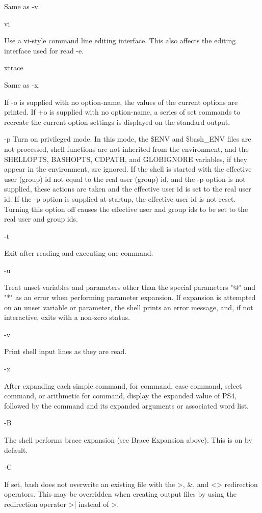 Same as -v.

vi

Use a vi-style command line editing interface. This also affects the editing interface used for read -e.

xtrace

Same as -x.

If -o is supplied with no option-name, the values of the current options are printed. If +o is supplied with no option-name, a series of set commands to recreate the current option settings is displayed on the standard output.

-p
Turn on privileged mode. In this mode, the \$ENV and \$bash\_ENV files are not processed, shell functions are not inherited from the environment, and the SHELLOPTS, BASHOPTS, CDPATH, and GLOBIGNORE variables, if they appear in the environment, are ignored. If the shell is started with the effective user (group) id not equal to the real user (group) id, and the -p option is not supplied, these actions are taken and the effective user id is set to the real user id. If the -p option is supplied at startup, the effective user id is not reset. Turning this option off causes the effective user and group ids to be set to the real user and group ids.

-t

Exit after reading and executing one command.

-u

Treat unset variables and parameters other than the special parameters "@" and "*" as an error when performing parameter expansion. If expansion is attempted on an unset variable or parameter, the shell prints an error message, and, if not interactive, exits with a non-zero status.

-v

Print shell input lines as they are read.

-x

After expanding each simple command, for command, case command, select command, or arithmetic for command, display the expanded value of PS4, followed by the command and its expanded arguments or associated word list.

-B

The shell performs brace expansion (see Brace Expansion above). This is on by default.

-C

If set, bash does not overwrite an existing file with the >, \&, and <> redirection operators. This may be overridden when creating output files by using the redirection operator >| instead of >.


